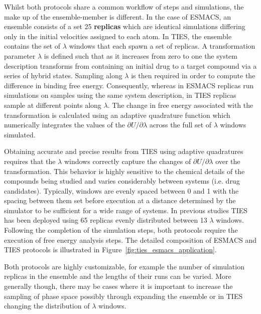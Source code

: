 Whilst both protocols share a common workflow of steps and simulations, 
the make up of the ensemble-member is different. 
In the case of ESMACS, an ensemble consists of a set 25 
\textbf{replicas} which are identical simulations differing only in the initial 
velocities assigned to each atom. 
In TIES, the ensemble contains the set of \textbf{$\lambda$} windows that each 
spawn a set of replicas. 
A transformation parameter $\lambda$ is defined such 
that as it increases from zero to one the system description transforms from 
containing an initial drug to a target compound via a series of hybrid states. 
Sampling along $\lambda$ is then required in order to compute the difference in 
binding free energy. Consequently, whereas in ESMACS replicas run simulations on 
samples using the same system description, in TIES replicas sample at 
different points along $\lambda$. 
The change in free energy associated with the 
transformation is calculated using an adaptive quadrature function which
numerically integrates the values of the $\partial U/\partial\lambda$ across the 
full set of $\lambda$ windows simulated. 

Obtaining accurate and precise results from TIES using adaptive quadratures 
requires that the $\lambda$ windows correctly capture the changes of 
$\partial U/\partial\lambda$ over the transformation. This behavior is highly 
sensitive to the chemical details of the compounds being studied and varies 
considerably between systems (i.e. drug candidates). 
Typically, windows are evenly spaced between 0 and 1 with the spacing between 
them set before execution 
at a distance determined by the simulator to be sufficient for a wide range of 
systems. In previous studies TIES has been deployed using 65 replicas evenly 
distributed between 13 $\lambda$ windows. 
Following the completion of the simulation steps, both protocols require 
the execution of free energy analysis steps.
The detailed composition of ESMACS and TIES protocols is illustrated in 
Figure~\ref{fig:ties_esmacs_application}. 


Both protocols are highly customizable, for example the number 
of simulation replicas in the ensemble and the lengths of their runs can be 
varied. 
More generally though, there may be cases where it is important to 
increase the sampling of phase space possibly through expanding the ensemble 
or in TIES changing the distribution of $\lambda$ windows.



